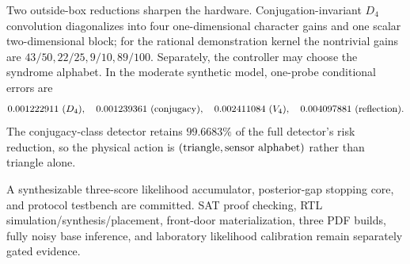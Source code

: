 Two outside-box reductions sharpen the hardware.  Conjugation-invariant $D_4$ convolution
diagonalizes into four one-dimensional character gains and one scalar two-dimensional
block; for the rational demonstration kernel the nontrivial gains are
$43/50,22/25,9/10,89/100$.  Separately, the controller may choose the syndrome alphabet.
In the moderate synthetic model, one-probe conditional errors are
\[
0.001222911\ (D_4),\quad0.001239361\ ({\rm conjugacy}),\quad
0.002411084\ (V_4),\quad0.004097881\ ({\rm reflection}).
\]
The conjugacy-class detector retains $99.6683\%$ of the full detector's risk reduction,
so the physical action is $(\hbox{triangle},\hbox{sensor alphabet})$ rather than triangle
alone.

A synthesizable three-score likelihood accumulator, posterior-gap stopping core, and
protocol testbench are committed.  SAT proof checking, RTL simulation/synthesis/placement,
front-door materialization, three PDF builds, fully noisy base inference, and laboratory
likelihood calibration remain separately gated evidence.
